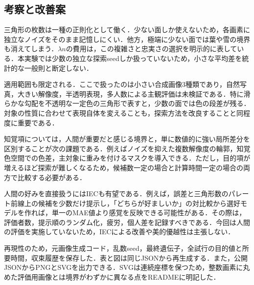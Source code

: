 \subsection{考察と改善案}
三角形の枚数は一種の正則化として働く．少ない面しか使えないため，各画素に独立なノイズをそのまま記憶しにくい．他方，極端に少ない面では葉や雪の境界も消えてしまう．$\lambda n$の費用は，この複雑さと忠実さの選択を明示的に表している．本実験では少数の独立な探索seedしか扱っていないため，小さな平均差を統計的な一般則と断定しない．

適用範囲も限定される．ここで扱ったのは小さい合成画像3種類であり，自然写真，大きい解像度，半透明表現，多人数による主観評価は未検証である．特に滑らかな勾配を不透明な一定色の三角形で表すと，少数の面では色の段差が残る．対象の性質に合わせて表現自体を変えることも，探索方法を改良することと同程度に重要である．

知覚項については，人間が重要だと感じる境界と，単に数値的に強い局所差分を区別することが次の課題である．例えばノイズを抑えた複数解像度の輪郭，知覚色空間での色差，主対象に重みを付けるマスクを導入できる．ただし，目的項が増えるほど探索が難しくなるため，候補数一定の場合と計算時間一定の場合の両方で比較する必要がある．

人間の好みを直接扱うにはIECも有望である．例えば，誤差と三角形数のパレート前線上の候補を少数だけ提示し，「どちらが好ましいか」の対比較から選好モデルを作れば，単一のMAE値より感覚を反映できる可能性がある．その際は，評価者数，提示順のランダム化，疲労，個人差を記録すべきである．今回は人間の評価を実施していないため，IECによる改善や美的優越性は主張しない．

再現性のため，元画像生成コード，乱数seed，最終遺伝子，全試行の目的値と所要時間，収束履歴を保存した．表と図は同じJSONから再生成する．また，公開JSONからPNGとSVGを出力できる．SVGは連続座標を保つため，整数画素に丸めた評価用画像とは境界がわずかに異なる点をREADMEに明記した．

